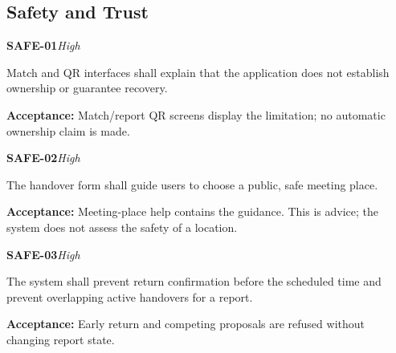 \documentclass[12pt,a4paper,oneside]{report}
\begin{document}

\subsection{Safety and Trust}

\noindent\begin{minipage}{\linewidth}\textbf{SAFE-01}\hfill\textit{High}\par\nopagebreak

Match and QR interfaces shall explain that the application does not establish ownership or guarantee recovery.

{\color{muted}\textbf{Acceptance:} Match/report QR screens display the limitation; no automatic ownership claim is made.\par}\end{minipage}\par\vspace{5pt}

\noindent\begin{minipage}{\linewidth}\textbf{SAFE-02}\hfill\textit{High}\par\nopagebreak

The handover form shall guide users to choose a public, safe meeting place.

{\color{muted}\textbf{Acceptance:} Meeting-place help contains the guidance. This is advice; the system does not assess the safety of a location.\par}\end{minipage}\par\vspace{5pt}

\noindent\begin{minipage}{\linewidth}\textbf{SAFE-03}\hfill\textit{High}\par\nopagebreak

The system shall prevent return confirmation before the scheduled time and prevent overlapping active handovers for a report.

{\color{muted}\textbf{Acceptance:} Early return and competing proposals are refused without changing report state.\par}\end{minipage}\par\vspace{5pt}

\end{document}
